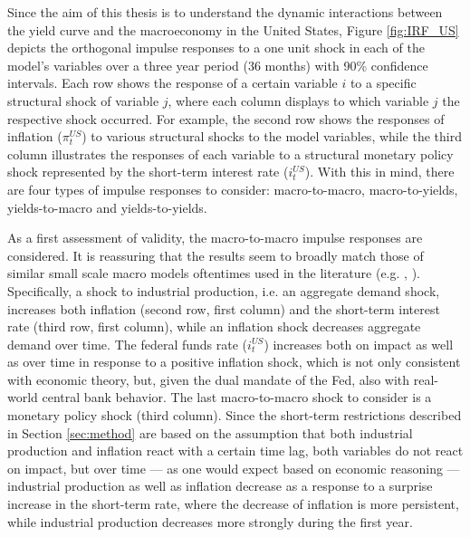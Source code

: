 


Since the aim of this thesis is to understand the dynamic interactions
between the yield curve and the macroeconomy in the United States, Figure \ref{fig:IRF_US} depicts the orthogonal impulse responses to a one unit shock in each of the model's variables over a three year period (36 months) with 90\% confidence intervals. 
Each row shows the response of a certain variable $i$ to a specific structural shock of variable $j$, where each column displays to which variable $j$ the respective shock occurred. 
For example, the second row shows the responses of inflation ($\pi^{US}_{t}$) to various structural shocks to the model variables, while the third column illustrates the responses of each variable to a structural monetary policy shock represented by the short-term interest rate ($i^{US}_{t}$). 
With this in mind, there are four types of impulse responses to consider: macro-to-macro, macro-to-yields, yields-to-macro and yields-to-yields.  




As a first assessment of validity, the macro-to-macro impulse responses are considered. 
It is reassuring that the results seem to broadly match those of similar small scale macro models oftentimes used in the literature (e.g. \citet{gali_1992}, \citet{stock2001vector}). 
Specifically, a shock to industrial production, i.e. an aggregate demand shock, increases both inflation (second row, first column) and the short-term interest rate (third row, first column), while an inflation shock decreases aggregate demand over time. 
The federal funds rate ($i^{US}_{t}$) increases both on impact as well as over time in response to a positive inflation shock, which is not only consistent with economic theory, but, given the dual mandate of the Fed, also with real-world central bank behavior.
The last macro-to-macro shock to consider is a monetary policy shock (third column). 
Since the short-term restrictions described in Section \ref{sec:method} are based on the assumption that both industrial production and inflation react with a certain time lag, both variables do not react on impact, but over time --- as one would expect based on economic reasoning --- industrial production as well as inflation decrease as a response to a surprise increase in the short-term rate, where the decrease of inflation is more persistent, while industrial production decreases more strongly during the first year. 

